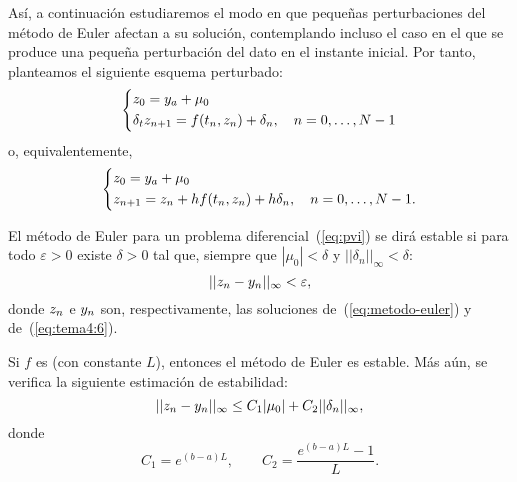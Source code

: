 Así, a continuación estudiaremos el modo en que pequeñas perturbaciones
del método de Euler afectan a su solución, contemplando incluso
el caso en el que se produce una pequeña perturbación del dato en el
instante inicial. Por tanto, planteamos el siguiente esquema
perturbado:
\begin{equation}\left\{
\begin{aligned}
  &z_0 = {y_a} + \mu_0 \\
  &\delta_t {z_{n+1}} = f({t_n},{z_n}) + \delta_n,\quad n=0,\dots,N-1
\end{aligned}\right.
\label{eq:metodo-euler-perturbado}
\end{equation}
o, equivalentemente,
\begin{equation}
\left\{
\begin{aligned}
  &z_0 = {y_a} + \mu_0 \\
  &{z_{n+1}} = {z_n} + h f({t_n},{z_n}) + h \delta_n,\quad n=0,\dots,N-1.
\end{aligned}
\right.
\label{eq:tema4:6}
\end{equation}

\begin{definition}
  \label{def:estabilidad}
  El método de Euler para un problema diferencial~(\ref{eq:pvi}) se
  dirá estable si para todo $\varepsilon>0$ existe $\delta>0$ tal que,
  siempre que $|\mu_0|<\delta$ y $||\delta_n||_\infty<\delta$:
  \begin{equation*}
    ||{z_n} - {y_n}||_\infty<\varepsilon,
  \end{equation*}
  donde ${z_n}$ e ${y_n}$ son, respectivamente, las soluciones
  de~(\ref{eq:metodo-euler}) y de~(\ref{eq:tema4:6}).
\end{definition}

\begin{theorem}
  \label{thm:estabilidad-euler}
  Si $f$ es \globLipschitz (con constante $L$), entonces el método de
  Euler es estable. Más aún, se verifica la siguiente estimación de
  estabilidad:
  \begin{equation*}
    ||{z_n} - {y_n}||_\infty \le C_1|\mu_0| + C_2 ||\delta_n||_\infty,
  \end{equation*}
  donde
  \begin{equation}
    \label{eq:euler-ctes-estimacion-estabilidad}
    C_1=e^{(b-a)L}, \qquad C_2=\frac{e^{(b-a)L}-1}{L}.
  \end{equation}
\end{theorem}

